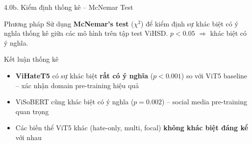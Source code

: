 \documentclass[11pt, aspectratio=169]{beamer}
\begin{document}
\begin{frame}[shrink=8]{4.0b. Kiểm định thống kê -- McNemar Test}

\begin{block}{Phương pháp}
  Sử dụng \textbf{McNemar's test} ($\chi^2$) để kiểm định sự khác biệt có ý nghĩa thống kê giữa các mô hình trên tập test ViHSD. $p < 0.05$ $\Rightarrow$ khác biệt có ý nghĩa.
\end{block}

\vspace{0.2cm}
\begin{table}[h]
  \centering
  \caption{Kết quả McNemar's test trên ViHSD (so với ViT5 balanced baseline)}
  \vspace{0.2cm}
\end{table}

\begin{block}{Kết luận thống kê}
  \begin{itemize}
    \item \textbf{ViHateT5} có sự khác biệt \textbf{rất có ý nghĩa} ($p < 0.001$) so với ViT5 baseline -- xác nhận domain pre-training hiệu quả
    \item ViSoBERT cũng khác biệt có ý nghĩa ($p = 0.002$) -- social media pre-training quan trọng
    \item Các biến thể ViT5 khác (hate-only, multi, focal) \textbf{không khác biệt đáng kể} với nhau
  \end{itemize}
\end{block}
\end{frame}
\end{document}
